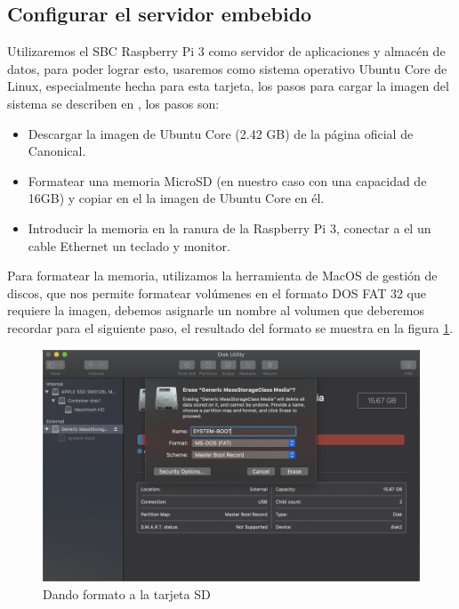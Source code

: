 \subsection{Configurar el servidor embebido}

Utilizaremos el SBC Raspberry Pi 3 \citep{MarcoTeorico19} como servidor de aplicaciones y almacén de datos, para poder lograr esto, usaremos como sistema operativo Ubuntu Core de Linux, especialmente hecha para esta tarjeta, los pasos para cargar la imagen del sistema se describen en \citep{InstallUbuntuCore}, los pasos son:

\begin{itemize}
    \item Descargar la imagen de Ubuntu Core (2.42 GB) de la página oficial de Canonical.
    \item Formatear una memoria MicroSD (en nuestro caso con una capacidad de 16GB) y copiar en el la imagen de Ubuntu Core en él.
    \item Introducir la memoria en la ranura de la Raspberry Pi 3, conectar a el un cable Ethernet un teclado y monitor.
\end{itemize}

Para formatear la memoria, utilizamos la herramienta de MacOS de gestión de discos, que nos permite formatear volúmenes en el formato DOS FAT 32 que requiere la imagen, debemos asignarle un nombre al volumen que deberemos recordar para el siguiente paso, el resultado del formato se muestra en la figura \ref{fig:formato}.
 
\begin{figure}[H]
	\centering
	\includegraphics[scale=.3]{Capitulo5/images/format.png}
	\caption{Dando formato a la tarjeta SD}
	\label{fig:formato}
\end{figure} 

